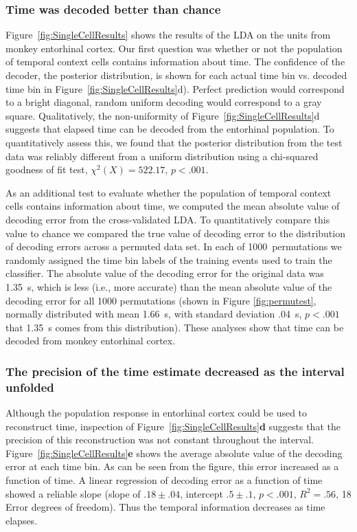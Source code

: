 \documentclass{apa}
\begin{document}
\subsubsection{Time was decoded better than chance}

Figure~\ref{fig:SingleCellResults} shows the results of the LDA on the units from
monkey entorhinal cortex. Our first question was whether or not the population
of temporal context cells contains information about time.
The confidence of the decoder, the posterior
distribution, is shown for each actual time bin vs. decoded time bin in
Figure~\ref{fig:SingleCellResults}d).  Perfect prediction would correspond to a
bright diagonal, random uniform decoding would correspond to a gray square.
Qualitatively, the non-uniformity of Figure~\ref{fig:SingleCellResults}d suggests
that elapsed time can be decoded from the entorhinal population.  To
quantitatively assess this, we found that the posterior distribution from the
test data was reliably different from a  uniform distribution using a
chi-squared goodness of fit test, $\chi^2(X) = 522.17$, $p<.001$.  

As an additional test to evaluate whether the population of temporal context
cells contains information about time, we computed the mean absolute value of decoding
error from the cross-validated LDA.
To quantitatively compare this value to chance we compared the true value of decoding error
to the distribution of decoding errors across a permuted data set.  In each of
1000~permutations we randomly assigned the time bin labels of the training
events used to train the classifier.  The absolute value of the decoding error for the original data
was 1.35~s, which is less (i.e., more accurate) than the mean absolute value of the decoding error for all 1000
permutations (shown in Figure \ref{fig:permutest}, normally distributed with mean 1.66~s, with standard deviation .04~s, $p<.001$ that 1.35~s comes from this distribution).  These analyses show that time can be decoded from monkey
entorhinal cortex.

\subsubsection{The precision of the time estimate decreased as the interval
unfolded}

Although the population response in entorhinal cortex could be used to
reconstruct time, inspection of Figure~\ref{fig:SingleCellResults}\textbf{d} suggests
that the precision of this reconstruction was not constant throughout the
interval.  Figure~\ref{fig:SingleCellResults}\textbf{e} shows the average absolute
value of the decoding error at each time bin.  As can be seen from the
figure, this error
increased as a function of time.  A linear regression of decoding error as a
function of time showed a reliable slope (slope of $.18\pm.04$, intercept $.5\pm.1$, $p < .001$, $R^2=.56$, 18 Error degrees of freedom).  
Thus the temporal information decreases as time elapses.
\end{document}
